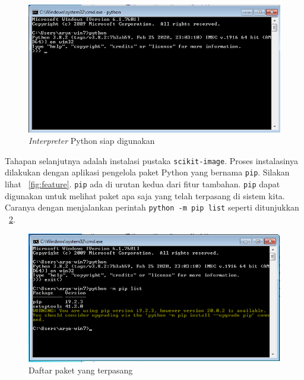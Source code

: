 \begin{figure}[h!]
  \begin{center}
    \includegraphics[scale=.5]{pics/pythonAktif.png}
    \caption{\textit{Interpreter} Python siap digunakan}
    \label{fig:siap}
  \end{center}
\end{figure}

Tahapan selanjutnya adalah instalasi pustaka \texttt{scikit-image}. Proses instalasinya dilakukan dengan aplikasi pengelola paket Python yang bernama \texttt{pip}. Silakan lihat \figurename~\ref{fig:feature}. \texttt{pip} ada di urutan kedua dari fitur tambahan. \texttt{pip} dapat digunakan untuk melihat paket apa saja yang telah terpasang di sistem kita. Caranya dengan menjalankan perintah \texttt{python -m pip list} seperti ditunjukkan \figurename~\ref{fig:daftarPaket}.

\begin{figure}[h!]
  \begin{center}
    \includegraphics[scale=.5]{pics/pipList.png}
    \caption{Daftar paket yang terpasang}
    \label{fig:daftarPaket}
  \end{center}
\end{figure}

